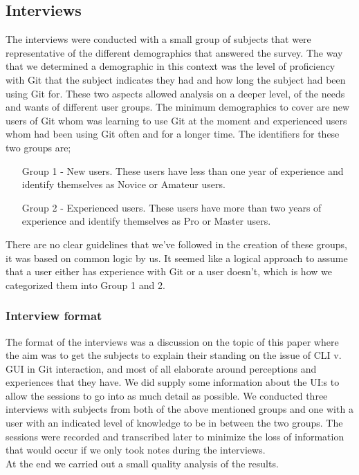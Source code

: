 \documentclass[a4paper,oneside]{bth} %
\begin{document}
				
				\subsection{Interviews}
				The interviews were conducted with a small group of subjects that were representative of the different demographics that answered the survey. The way that we determined a demographic in this context was the level of proficiency with Git that the subject indicates they had and how long the subject had been using Git for. 
				These two aspects allowed analysis on a deeper level, of the needs and wants of different user groups. The minimum demographics to cover are new users of Git whom was learning to use Git at the moment and experienced users whom had been using Git often and for a longer time. The identifiers for these two groups are;
				\begin{itemize}
					\item[Group 1 - New users.]
					These users have less than one year of experience and identify themselves as Novice or Amateur users.
					\item[Group 2 - Experienced users.]
					These users have more than two years of experience and identify themselves as Pro or Master users.
				\end{itemize}
				There are no clear guidelines that we've followed in the creation of these groups, it was based on common logic by us. It seemed like a logical approach to assume that a user either has experience with Git or a user doesn't, which is how we categorized them into Group 1 and 2.
				
					\subsubsection*{Interview format}
					The format of the interviews was a discussion on the topic of this paper where the aim was to get the subjects to explain their standing on the issue of CLI v. GUI in Git interaction, and most of all elaborate around perceptions and experiences that they have. We did supply some information about the UI:s to allow the sessions to go into as much detail as possible. 
					We conducted three interviews with subjects from both of the above mentioned groups and one with a user with an indicated level of knowledge to be in between the two groups. The sessions were recorded and transcribed later to minimize the loss of information that would occur if we only took notes during the interviews.\\
					At the end we carried out a small quality analysis of the results.
					
\end{document}

